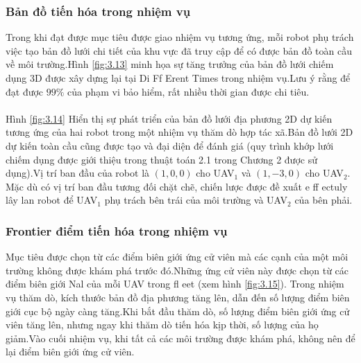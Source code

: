 \documentclass[11pt,openany]{book}
\begin{document}
\begin{algorimth}[H]
\subsubsection{Bản đồ tiến hóa trong nhiệm vụ}
Trong khi đạt được mục tiêu được giao nhiệm vụ tương ứng, mỗi robot phụ trách việc tạo bản đồ lưới chi tiết của khu vực đã truy cập để có được bản đồ toàn cầu về môi trường.Hình \ref{fig:3.13} minh họa sự tăng trưởng của bản đồ lưới chiếm dụng 3D được xây dựng lại tại Di Ff Erent Times trong nhiệm vụ.Lưu ý rằng để đạt được $99\%$ của phạm vi bảo hiểm, rất nhiều thời gian được chi tiêu.\\\\
Hình \ref{fig:3.14} Hiển thị sự phát triển của bản đồ lưới địa phương 2D dự kiến tương ứng của hai robot trong một nhiệm vụ thăm dò hợp tác xã.Bản đồ lưới 2D dự kiến toàn cầu cũng được tạo và đại diện để đánh giá (quy trình khớp lưới chiếm dụng được giới thiệu trong thuật toán 2.1 trong Chương 2 được sử dụng).Vị trí ban đầu của robot là $(1,0,0)$ cho UAV$_1$ và $(1,-3,0)$ cho UAV$_2$. Mặc dù có vị trí ban đầu tương đối chặt chẽ, chiến lược được đề xuất e ff ectuly lây lan robot để UAV$_1$ phụ trách bên trái của môi trường và UAV$_2$ của bên phải.
\subsubsection{Frontier điểm tiến hóa trong nhiệm vụ}
Mục tiêu được chọn từ các điểm biên giới ứng cử viên mà các cạnh của một môi trường không được khám phá trước đó.Những ứng cử viên này được chọn từ các điểm biên giới Nal của mỗi UAV trong fl eet (xem hình \ref{fig:3.15}). Trong nhiệm vụ thăm dò, kích thước bản đồ địa phương tăng lên, dẫn đến số lượng điểm biên giới cục bộ ngày càng tăng.Khi bắt đầu thăm dò, số lượng điểm biên giới ứng cử viên tăng lên, nhưng ngay khi thăm dò tiến hóa kịp thời, số lượng của họ giảm.Vào cuối nhiệm vụ, khi tất cả các môi trường được khám phá, không nên để lại điểm biên giới ứng cử viên.

\end{algorimth}
\end{document}
